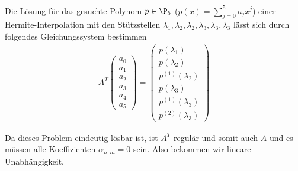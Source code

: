 \begin{solution}
\begin{enumerate}[label = \textbf{\alph*)}]
  Die Lösung für das gesuchte Polynom $p \in \P_5$ ($p(x) = \sum_{j=0}^5 a_j x^j$) einer Hermite-Interpolation mit den Stützstellen $\lambda_1, \lambda_2, \lambda_2, \lambda_3, \lambda_3, \lambda_3$ lässt sich durch folgendes Gleichungssystem bestimmen
  \begin{align*}
    A^T  \begin{pmatrix}
      a_0 \\ a_1 \\ a_2 \\ a_3 \\ a_4 \\ a_5
    \end{pmatrix} =
    \begin{pmatrix}
      p(\lambda_1) \\ p(\lambda_2) \\ p^{(1)}(\lambda_2) \\ p(\lambda_3) \\ p^{(1)}(\lambda_3) \\ p^{(2)}(\lambda_3)
    \end{pmatrix}
  \end{align*}

  Da dieses Problem eindeutig lösbar ist, ist $A^T$ regulär und somit auch $A$ und es müssen alle Koeffizienten $\alpha_{n,m} = 0$ sein. Also bekommen wir lineare Unabhängigkeit.
\end{enumerate}
\end{solution}
